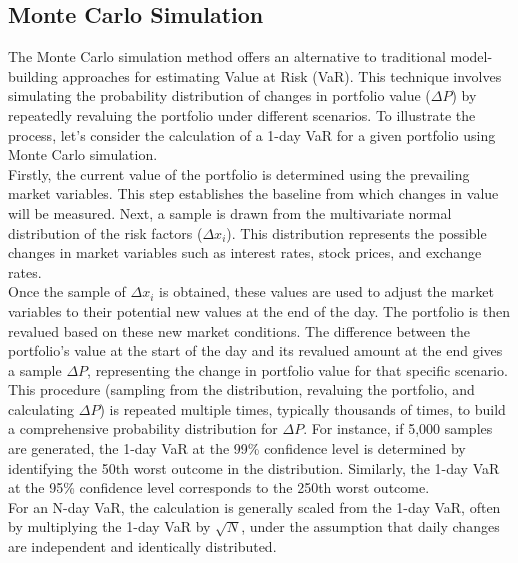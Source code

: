 \documentclass[a4paper,10pt]{article}
\begin{document}
\subsection{Monte Carlo Simulation}

\noindent The Monte Carlo simulation method offers an alternative to traditional model-building approaches for estimating Value at Risk (VaR). This technique involves simulating the probability distribution of changes in portfolio value (\(\Delta P\)) by repeatedly revaluing the portfolio under different scenarios. To illustrate the process, let's consider the calculation of a 1-day VaR for a given portfolio using Monte Carlo simulation.\\

\noindent Firstly, the current value of the portfolio is determined using the prevailing market variables. This step establishes the baseline from which changes in value will be measured. Next, a sample is drawn from the multivariate normal distribution of the risk factors (\(\Delta x_i\)). This distribution represents the possible changes in market variables such as interest rates, stock prices, and exchange rates.\\

\noindent Once the sample of \(\Delta x_i\) is obtained, these values are used to adjust the market variables to their potential new values at the end of the day. The portfolio is then revalued based on these new market conditions. The difference between the portfolio's value at the start of the day and its revalued amount at the end gives a sample \(\Delta P\), representing the change in portfolio value for that specific scenario.\\

\noindent This procedure (sampling from the distribution, revaluing the portfolio, and calculating \(\Delta P\)) is repeated multiple times, typically thousands of times, to build a comprehensive probability distribution for \(\Delta P\). For instance, if 5,000 samples are generated, the 1-day VaR at the 99\% confidence level is determined by identifying the 50th worst outcome in the distribution. Similarly, the 1-day VaR at the 95\% confidence level corresponds to the 250th worst outcome.\\

\noindent For an N-day VaR, the calculation is generally scaled from the 1-day VaR, often by multiplying the 1-day VaR by \(\sqrt{N}\), under the assumption that daily changes are independent and identically distributed.\\
\end{document}
